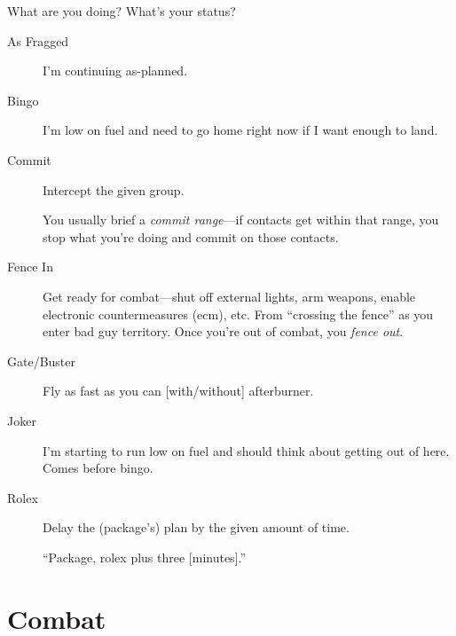 What are you doing? What's your status?
\begin{description}

\item[As Fragged] I'm continuing as-planned.

\item[Bingo] I'm low on fuel and need to go home right now if I want enough
    to land.

\item[Commit] Intercept the given group.

    You usually brief a \emph{commit range}---if contacts get within that range,
    you stop what you're doing and commit on those contacts.

\item[Fence In] Get ready for combat---shut off external lights,
    arm weapons, enable electronic countermeasures \ac{(ecm)}, etc.
    From ``crossing the fence'' as you enter bad guy territory.
    Once you're out of combat, you \emph{fence out}.

\item[Gate/Buster] Fly as fast as you can [with/without] afterburner.

\item[Joker] I'm starting to run low on fuel and should think about getting
    out of here. Comes before bingo.

\item[Rolex] Delay the (package's) plan by the given amount of time.

    ``Package, rolex plus three [minutes].''
\end{description}

\section{Combat}

